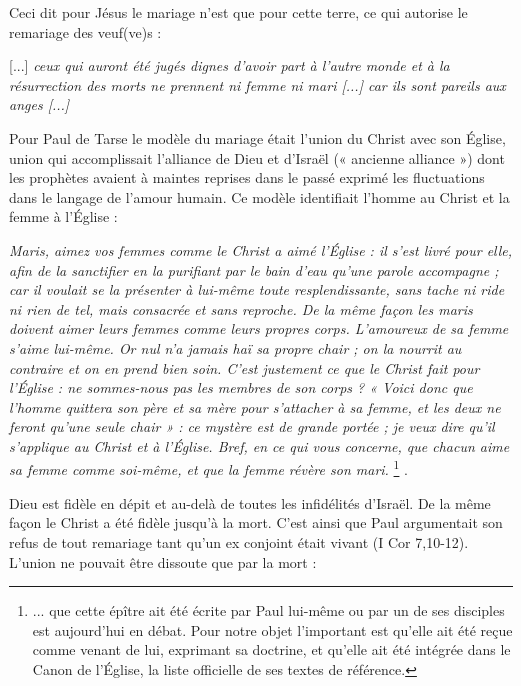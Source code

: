  Ceci dit pour Jésus le mariage n'est que pour cette terre, ce qui autorise le remariage des veuf(ve)s :

\begin{displayquote}[Luc 20, 34-36]

[...] \emph{ceux qui auront été jugés dignes d'avoir part à l'autre monde et à la résurrection des morts ne prennent ni femme ni mari \emph{[...]} car ils sont pareils aux anges \emph{[...]}}
\end{displayquote}

 Pour Paul de Tarse le modèle du mariage était l'union du Christ avec son Église, union qui accomplissait l'alliance de Dieu et d'Israël (« ancienne alliance ») dont les prophètes avaient à maintes reprises dans le passé exprimé les fluctuations dans le langage de l'amour humain. Ce modèle identifiait l'homme au Christ et la femme à l'Église :

\begin{displayquote}[Eph. 5,25-33]
\emph{Maris, aimez vos femmes comme le Christ a aimé l'Église : il s'est livré pour elle, afin de la sanctifier en la purifiant par le bain d'eau qu'une parole accompagne ; car il voulait se la présenter à lui-même toute resplendissante, sans tache ni ride ni rien de tel, mais consacrée et sans reproche. De la même façon les maris doivent aimer leurs femmes comme leurs propres corps. L'amoureux de sa femme s'aime lui-même. Or nul n'a jamais haï sa propre chair ; on la nourrit au contraire et on en prend bien soin. C'est justement ce que le Christ fait pour l'Église : ne sommes-nous pas les membres de son corps ? « Voici donc que l'homme quittera son père et sa mère pour s'attacher à sa femme, et les deux ne feront qu'une seule chair » : ce mystère est de grande portée ; je veux dire qu'il s'applique au Christ et à l'Église. Bref, en ce qui vous concerne, que chacun aime sa femme comme soi-même, et que la femme révère son mari.}
\footnote{... que cette épître ait été écrite par Paul lui-même ou par un de ses disciples est aujourd'hui en débat. Pour notre objet l'important est qu'elle ait été reçue comme venant de lui, exprimant sa doctrine, et qu'elle ait été intégrée dans le Canon de l'Église, la liste officielle de ses textes de référence.}%
.
\end{displayquote}

 Dieu est fidèle en dépit et au-delà de toutes les infidélités d'Israël. De la même façon le Christ a été fidèle jusqu'à la mort. C'est ainsi que Paul argumentait son refus de tout remariage tant qu'un ex conjoint était vivant (I Cor 7,10-12). L'union ne pouvait être dissoute que par la mort :

